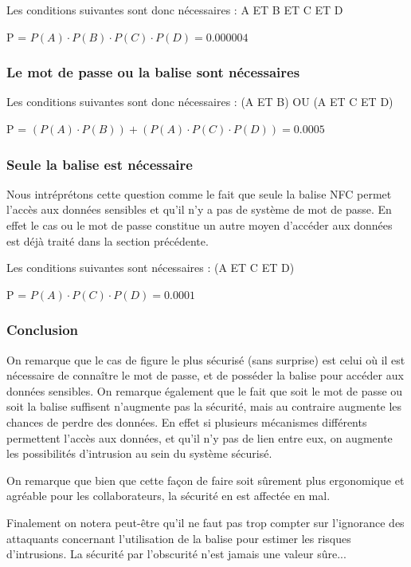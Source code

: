 \documentclass[francais,12pt]{article}
\begin{document}
	 Les conditions suivantes sont donc nécessaires : A ET B ET C ET D
	 
	 P = $ P(A)  \cdot P(B) \cdot P(C) \cdot P(D) = 0.000004 $
	 
	 \subsubsection*{Le mot de passe ou la balise sont nécessaires}
	 Les conditions suivantes sont donc nécessaires : (A ET B) OU (A ET C ET D)
	 
	 P = $ (P(A) \cdot P(B)) + (P(A) \cdot P(C) \cdot P(D)) = 0.0005 $
	 
	 \subsubsection*{Seule la balise est nécessaire}
	 Nous intréprétons cette question comme le fait que seule la balise NFC permet l'accès aux données sensibles et qu'il n'y a pas de système de mot de passe. En effet le cas ou le mot de passe constitue un autre moyen d'accéder aux données est déjà traité dans la section précédente.
	 
	 Les conditions suivantes sont nécessaires : (A ET C ET D)
	 
	 P = $ P(A) \cdot P(C) \cdot P(D) = 0.0001 $
	 
	 \subsubsection*{Conclusion}
	 On remarque que le cas de figure le plus sécurisé (sans surprise) est celui où il est nécessaire de connaître le mot de passe, et de posséder la balise pour accéder aux données sensibles. On remarque également que le fait que soit le mot de passe ou soit la balise suffisent n'augmente pas la sécurité, mais au contraire augmente les chances de perdre des données. En effet si plusieurs mécanismes différents permettent l'accès aux données, et qu'il n'y pas de lien entre eux, on augmente les possibilités d'intrusion au sein du système sécurisé. 
	 
	 On remarque que bien que cette façon de faire soit sûrement plus ergonomique et agréable pour les collaborateurs, la sécurité en est affectée en mal.
	 
	 Finalement on notera peut-être qu'il ne faut pas trop compter sur l'ignorance des attaquants concernant l'utilisation de la balise pour estimer les risques d'intrusions. La sécurité par l'obscurité n'est jamais une valeur sûre...
	 
\end{document}

